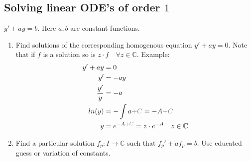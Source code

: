 \documentclass[8pt]{extarticle}
\newcommand{\C}{{\mathbb C}}
\newcommand{\ra}{{\rightarrow}}
\def\light#1{{\color{light}#1}}
\begin{document}
\begin{multicols*}{3}
  \subsection{Solving linear ODE's of order $1$}
$y' + ay = b.$ Here $a, b$ are constant functions.
\begin{tcolorbox}[colback=blue!5!white,colframe=blue!75!black]
  \begin{enumerate}[label=(\arabic*)]
    \item Find solutions of the corresponding homogenous equation
          $y' + ay = 0$. Note that if $f$ is a solution so is
          $z \cdot f \quad \forall z \in \C$.
          Example:
          \begin{align*}
            y' + ay      & = 0                                                \\
            y'           & = -ay                                              \\
            \frac{y'}{y} & = -a                                               \\
            ln(y)        & = - \int a \light{+C} = -A \light{+C}              \\
            y            & = e^{-A \light{+C}} = z \cdot e^{-A}\quad z \in \C
          \end{align*}
    \item Find a particular solution $f_p: I \ra \C$
          such that $f_p' + af_p = b$. Use educated guess or variation of constants.
  \end{enumerate}
\end{tcolorbox}

\end{multicols*}
\end{document}
